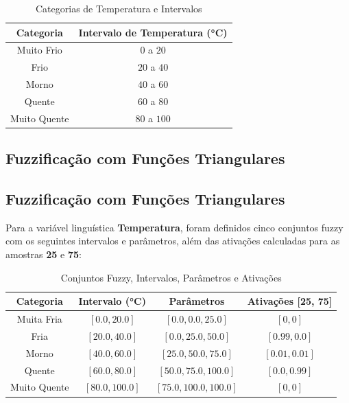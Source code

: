 \documentclass[a4paper,12pt]{article}
\begin{document}
\begin{table}[H]
\centering
\caption{Categorias de Temperatura e Intervalos}
\begin{tabular}{|c|c|}
\hline
\textbf{Categoria}    & \textbf{Intervalo de Temperatura (°C)} \\ \hline
Muito Frio            & $0$ a $20$                            \\ \hline
Frio                  & $20$ a $40$                           \\ \hline
Morno                 & $40$ a $60$                           \\ \hline
Quente                & $60$ a $80$                           \\ \hline
Muito Quente          & $80$ a $100$                          \\ \hline
\end{tabular}
\end{table}

\subsection{Fuzzificação com Funções Triangulares}

\subsection{Fuzzificação com Funções Triangulares}

Para a variável linguística \textbf{Temperatura}, foram definidos cinco conjuntos fuzzy com os seguintes intervalos e parâmetros, além das ativações calculadas para as amostras \textbf{25} e \textbf{75}:

\begin{table}[H]
\centering
\caption{Conjuntos Fuzzy, Intervalos, Parâmetros e Ativações}
\begin{tabular}{|c|c|c|c|}
\hline
\textbf{Categoria}    & \textbf{Intervalo (°C)} & \textbf{Parâmetros}       & \textbf{Ativações [25, 75]} \\ \hline
Muita Fria            & $[0.0, 20.0]$          & $[0.0, 0.0, 25.0]$        & $[0, 0]$                   \\ \hline
Fria                  & $[20.0, 40.0]$         & $[0.0, 25.0, 50.0]$       & $[0.99, 0.0]$              \\ \hline
Morno                 & $[40.0, 60.0]$         & $[25.0, 50.0, 75.0]$      & $[0.01, 0.01]$             \\ \hline
Quente                & $[60.0, 80.0]$         & $[50.0, 75.0, 100.0]$     & $[0.0, 0.99]$              \\ \hline
Muito Quente          & $[80.0, 100.0]$        & $[75.0, 100.0, 100.0]$    & $[0, 0]$                   \\ \hline
\end{tabular}
\end{table}
\end{document}
